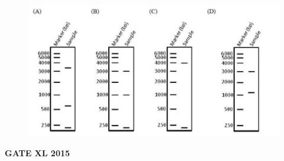 \documentclass[journal,12pt,onecolumn]{IEEEtran}
\begin{document}
\begin{enumerate}
	\begin{figure}[h!]
		\centering
	\includegraphics[width=\columnwidth]{45op}
		    \caption*{}
		\label{fig:Q45op}
	\end{figure}
\hfill{\textbf{GATE XL 2015}}
	


\end{enumerate}
\end{document}
